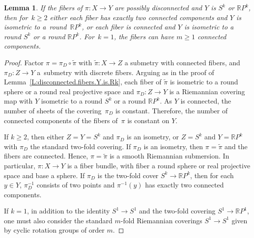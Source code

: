 \documentclass[pdftex]{sigma}
\numberwithin{equation}{section}
\newtheorem{lem}[thm]{Lemma}
\theoremstyle{definition}
\newcommand{\Sp}{S} %
\newcommand{\RP}{\mathbb{R}P} %
\begin{document}
\begin{lem}
If the fibers of $\pi\colon X\to Y$ are possibly disconnected and $Y$ is $S^k$ or $\RP^k$, then for~${k\geq 2}$ either each fiber has exactly two connected components and $Y$ is isometric to a~round~$\RP^{k}$, or each fiber is connected and $Y$ is isometric to a round $\Sp^k$ or a round $\RP^k$. For~${k=1}$, the fibers can have $m\geq 1$ connected components.
\end{lem}

\begin{proof}
Factor $\pi=\pi_D\circ\tilde{\pi}$ with $\tilde{\pi}\colon X\to Z$ a submetry with connected fibers, and $\pi_D\colon Z\to Y$ a~submetry with discrete fibers.
Arguing as in the proof of Lemma~\ref{L:disconnected.fibers.Y.is.Rk}, each fiber of $\tilde{\pi}$ is isometric to a round sphere or a round real projective space and $\pi_D\colon Z\to Y$ is a Riemannian covering map with $Y$ isometric to a round $S^k$ or a round $\RP^k$.
As $Y$ is connected, the number of sheets of the covering~$\pi_D$ is constant. Therefore, the number of connected components of the fibers of~$\pi$ is constant on $Y$.

If $k\geq 2$, then either $Z=Y = S^k$ and $\pi_D$ is an isometry, or $Z=S^k$ and $Y=\RP^k$ with $\pi_D$ the standard two-fold covering.
If $\pi_D$ is an isometry, then $\pi = \tilde{\pi}$ and the fibers are connected.
Hence, $\pi = \tilde{\pi}$ is a smooth Riemannian submersion. In particular, $\pi\colon X\to Y$ is a fiber bundle, with fiber a round sphere or real projective space and base a sphere. If $\pi_D$ is the two-fold cover $S^k\to \RP^k$, then for each $y\in Y$, $\pi^{-1}_D$ consists of two points and $\pi^{-1}(y)$ has exactly two connected components.

If $k=1$, in addition to the identity $S^1\to S^1$ and the two-fold covering $S^1\to \RP^1$, one must also consider the standard $m$-fold Riemannian coverings $S^1\to S^1$ given by cyclic rotation groups of order $m$.
\end{proof}
\end{document}
